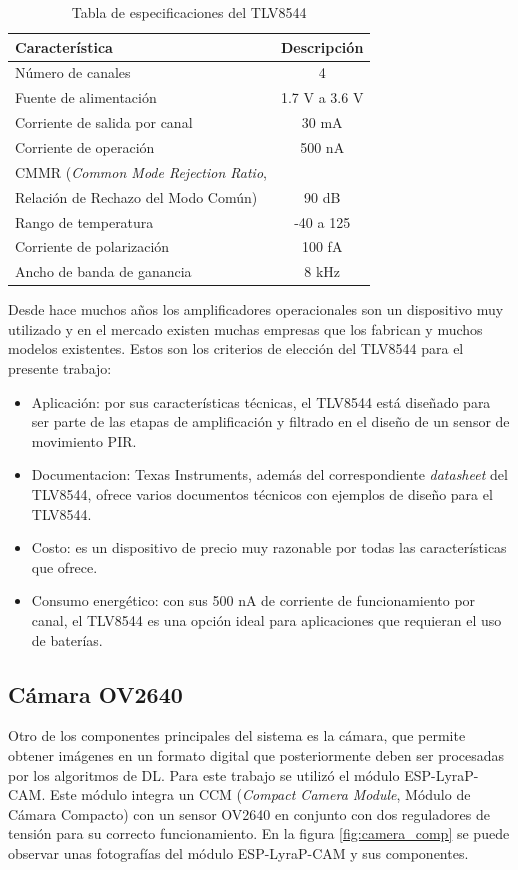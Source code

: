 \begin{table}[h]
	\centering
	\caption[TLV8544 especificaciones]{Tabla de especificaciones del TLV8544}
	\begin{tabular}{lc}   
		\toprule
		\textbf{Característica} 	 & \textbf{Descripción}  \\
		\midrule
		Número de canales & 4 \\
		Fuente de alimentación & 1.7 V a 3.6 V \\
		Corriente de salida por canal & 30 mA \\
		Corriente de operación & 500 nA \\
		CMMR (\textit{Common Mode Rejection Ratio}, \\ Relación de Rechazo del Modo Común) & 90 dB \\
		Rango de temperatura & -40 \textcelsius  a 125 \textcelsius\\
		Corriente de polarización & 100 fA \\
		Ancho de banda de ganancia & 8 kHz \\
		\bottomrule
		\hline
	\end{tabular}
	\label{tab:opamp_specs}
\end{table}

Desde hace muchos años los amplificadores operacionales son un dispositivo muy utilizado y en el mercado existen muchas empresas que los fabrican y muchos modelos existentes. Estos son los criterios de elección del TLV8544 para el presente trabajo:
\begin{itemize}
	\item Aplicación: por sus características técnicas, el TLV8544 está diseñado para ser parte de las etapas de amplificación y filtrado en el diseño de un sensor de movimiento PIR.
	\item Documentacion: Texas Instruments, además del correspondiente \textit{datasheet} del TLV8544, ofrece varios documentos técnicos con ejemplos de diseño para el TLV8544.
	\item Costo: es un dispositivo de precio muy razonable por todas las características que ofrece.
	\item Consumo energético: con sus 500 nA de corriente de funcionamiento por canal, el TLV8544 es una opción ideal para aplicaciones que requieran el uso de baterías.
\end{itemize}

\subsection{Cámara OV2640}
Otro de los componentes principales del sistema es la cámara, que permite obtener imágenes en un formato digital que posteriormente deben ser procesadas por los algoritmos de DL. Para este trabajo se utilizó el módulo ESP-LyraP-CAM. Este módulo integra un CCM (\textit{Compact Camera Module}, Módulo de Cámara Compacto) con un sensor OV2640 en conjunto con dos reguladores de tensión para su correcto funcionamiento. En la figura \ref{fig:camera_comp} se puede observar unas fotografías del módulo ESP-LyraP-CAM y sus componentes.

